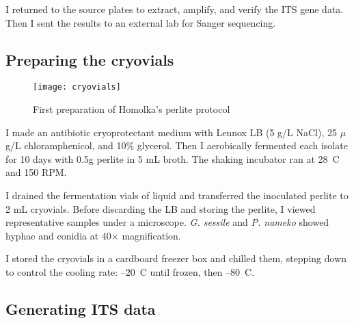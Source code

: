 \documentclass{article}
\begin{document}
I returned to the source plates to extract, amplify, and verify the ITS gene data.
Then I sent the results to an external lab for Sanger sequencing.


\subsection{Preparing the cryovials}

\begin{wrapfigure}{r}{0.5\textwidth}
	\texttt{[image: cryovials]}
	\caption{First preparation of Homolka's perlite protocol}
\end{wrapfigure}

I made an antibiotic cryoprotectant medium with Lennox LB (5 g/L NaCl), 25 $\mu$g/L chloramphenicol, and 10\% glycerol.
Then I aerobically fermented each isolate for 10 days with 0.5g perlite in 5 mL broth.
The shaking incubator ran at 28~\textdegree C and 150 RPM.

I drained the fermentation vials of liquid and transferred the inoculated perlite to 2 mL cryovials.
Before discarding the LB and storing the perlite, I viewed representative samples under a microscope.
\emph{G. sessile} and \emph{P. nameko} showed hyphae and conidia at 40$\times$ magnification.

I stored the cryovials in a cardboard freezer box and chilled them, stepping down to control the cooling rate: --20~\textdegree C until frozen, then --80~\textdegree C.


\subsection{Generating ITS data}



\end{document}
